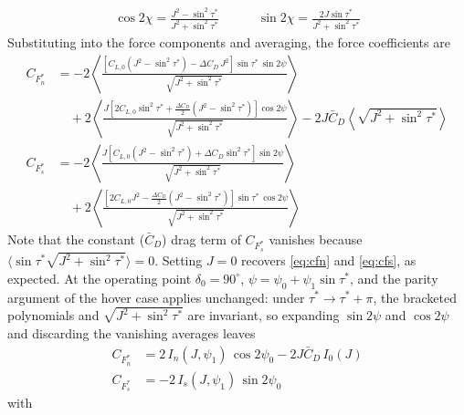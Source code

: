 \documentclass[11pt,letterpaper]{article}
\begin{document}
\begin{align}
    \cos 2\chi = \frac{J^2 - \sin^2\tau^*}{J^2 + \sin^2\tau^*}
    \quad\quad\quad
    \sin 2\chi = \frac{2 J \sin\tau^*}{J^2 + \sin^2\tau^*}
\end{align}
Substituting into the force components and averaging, the force
coefficients are
\begin{align}
    C_{F^*_n} &= -2 \left\langle \frac{\left[ C_{L,0} \left( J^2 - \sin^2\tau^* \right) - \Delta C_D\, J^2 \right] \sin\tau^*\, \sin2\psi}{\sqrt{J^2 + \sin^2\tau^*}} \right\rangle \nonumber \\
    &\quad + 2 \left\langle \frac{J \left[ 2 C_{L,0} \sin^2\tau^* + \frac{\Delta C_D}{2} \left( J^2 - \sin^2\tau^* \right) \right] \cos2\psi}{\sqrt{J^2 + \sin^2\tau^*}} \right\rangle
    - 2 J \bar{C}_D \left\langle \sqrt{J^2 + \sin^2\tau^*} \right\rangle \label{eq:cfn-general} \\
    C_{F^*_s} &= -2 \left\langle \frac{J \left[ C_{L,0} \left( J^2 - \sin^2\tau^* \right) + \Delta C_D \sin^2\tau^* \right] \sin2\psi}{\sqrt{J^2 + \sin^2\tau^*}} \right\rangle \nonumber \\
    &\quad + 2 \left\langle \frac{\left[ 2 C_{L,0} J^2 - \frac{\Delta C_D}{2} \left( J^2 - \sin^2\tau^* \right) \right] \sin\tau^*\, \cos2\psi}{\sqrt{J^2 + \sin^2\tau^*}} \right\rangle \label{eq:cfs-general}
\end{align}
Note that the constant ($\bar{C}_D$) drag term of $C_{F^*_s}$ vanishes
because $\langle \sin\tau^* \sqrt{J^2 + \sin^2\tau^*} \rangle = 0$.
Setting $J = 0$ recovers \autoref{eq:cfn} and \autoref{eq:cfs},
as expected. At the operating point $\delta_0 = 90^\circ$,
$\psi = \psi_0 + \psi_1 \sin\tau^*$, and the parity argument of the
hover case applies unchanged: under $\tau^* \to \tau^* + \pi$, the
bracketed polynomials and $\sqrt{J^2 + \sin^2\tau^*}$ are invariant,
so expanding $\sin2\psi$ and $\cos2\psi$ and discarding the vanishing
averages leaves
\begin{align}
    C_{F^*_n} &= 2\, I_n(J, \psi_1)\, \cos2\psi_0 - 2 J \bar{C}_D\, I_0(J) \label{eq:cfn-general-op} \\
    C_{F^*_s} &= -2\, I_s(J, \psi_1)\, \sin2\psi_0 \label{eq:cfs-general-op}
\end{align}
with
\end{document}
